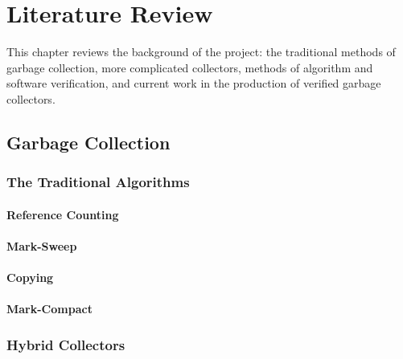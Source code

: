 \chapter{Literature Review}

This chapter reviews the background of the project: the traditional
methods of garbage collection, more complicated collectors, methods of
algorithm and software verification, and current work in the
production of verified garbage collectors.

\section{Garbage Collection}


\subsection{The Traditional Algorithms}

\subsubsection{Reference Counting}


\subsubsection{Mark-Sweep}


\subsubsection{Copying}


\subsubsection{Mark-Compact}


\subsection{Hybrid Collectors}

